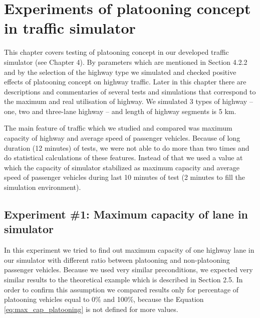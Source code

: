 \chapter[Experiments of platooning concept in traffic simulator]{Experiments of platooning concept in traffic simulator}

This chapter covers testing of platooning concept in our developed traffic simulator (see Chapter 4). By parameters which are mentioned in Section 4.2.2 and by the selection of the highway type we simulated and checked positive effects of platooning concept on highway traffic. Later in this chapter there are descriptions and commentaries of several tests and simulations that correspond to the maximum and real utilisation of highway. We simulated 3 types of highway – one, two and three-lane highway – and length of highway segments is 5 km.

The main feature of traffic which we studied and compared was maximum capacity of highway and average speed of passenger vehicles. Because of long duration (12 minutes) of tests, we were not able to do more than two times and do statistical calculations of these features. Instead of that we used a value at which the capacity of simulator stabilized as maximum capacity and average speed of passenger vehicles during last 10 minutes of test (2 minutes to fill the simulation environment).








\section[Experiment \#1: Maximum capacity of lane in simulator]{Experiment \#1: Maximum capacity of lane in simulator}

In this experiment we tried to find out maximum capacity of one highway lane in our simulator with different ratio between platooning and non-platooning passenger vehicles. Because we used very similar preconditions, we expected very similar results to the theoretical example which is described in Section 2.5. In order to confirm this assumption we compared results only for percentage of platooning vehicles equal to 0\% and 100\%, because the Equation \ref{eq:max_cap_platooning} is not defined for more values.





